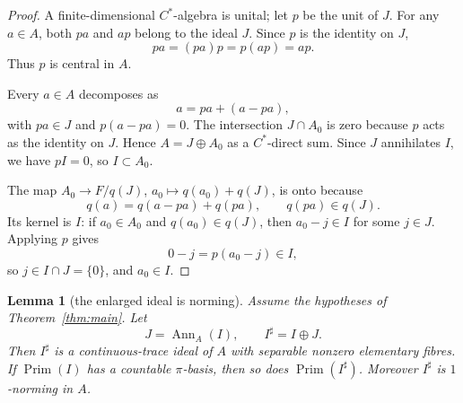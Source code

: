 \documentclass[11pt]{article}
\newtheorem{lemma}{Lemma}
\newcommand{\Prim}{\operatorname{Prim}}
\newcommand{\Ann}{\operatorname{Ann}}
\begin{document}
\begin{proof}
A finite-dimensional \(C^*\)-algebra is unital; let \(p\) be the unit of
\(J\).  For any \(a\in A\), both \(pa\) and \(ap\) belong to the ideal \(J\).
Since \(p\) is the identity on \(J\),
\[
        pa=(pa)p=p(ap)=ap.
\]
Thus \(p\) is central in \(A\).

Every \(a\in A\) decomposes as
\[
        a=pa+(a-pa),
\]
with \(pa\in J\) and \(p(a-pa)=0\).  The intersection
\(J\cap A_0\) is zero because \(p\) acts as the identity on \(J\).  Hence
\(A=J\oplus A_0\) as a \(C^*\)-direct sum.  Since \(J\) annihilates \(I\), we
have \(pI=0\), so \(I\subset A_0\).

The map \(A_0\to F/q(J)\), \(a_0\mapsto q(a_0)+q(J)\), is onto because
\[
        q(a)=q(a-pa)+q(pa),
        \qquad
        q(pa)\in q(J).
\]
Its kernel is \(I\): if \(a_0\in A_0\) and \(q(a_0)\in q(J)\), then
\(a_0-j\in I\) for some \(j\in J\).  Applying \(p\) gives
\[
        0-j=p(a_0-j)\in I,
\]
so \(j\in I\cap J=\{0\}\), and \(a_0\in I\).
\end{proof}

\begin{lemma}[the enlarged ideal is norming]
\label{lem:enlarged-norming}
Assume the hypotheses of Theorem~\ref{thm:main}.  Let
\[
        J=\Ann_A(I),
        \qquad
        I^\sharp=I\oplus J.
\]
Then \(I^\sharp\) is a continuous-trace ideal of \(A\) with separable nonzero
elementary fibres.  If \(\Prim(I)\) has a countable \(\pi\)-basis, then so
does \(\Prim(I^\sharp)\).  Moreover \(I^\sharp\) is \(1\)-norming in \(A\).
\end{lemma}
\end{document}
